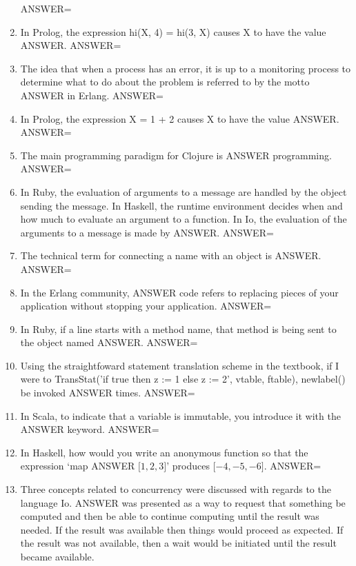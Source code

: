 \documentclass{exam}
\begin{document}
\begin{enumerate}
ANSWER=
\item In Prolog, the expression hi(X, 4) = hi(3, X) causes X to have the value ANSWER.\newline
ANSWER=
\item The idea that when a process has an error, it is up to a monitoring process to determine what to do about the problem is referred to by the motto ANSWER in Erlang.\newline
ANSWER=
\item In Prolog, the expression X = 1 + 2 causes X to have the value ANSWER.\newline
ANSWER=
\item The main programming paradigm for Clojure is ANSWER programming.\newline
ANSWER=
\item In Ruby, the evaluation of arguments to a message are handled by the object sending the message.  In Haskell, the runtime environment decides when and how much to evaluate an argument to a function.  In Io, the evaluation of the arguments to a message is made by ANSWER.\newline
ANSWER=
\item The technical term for connecting a name with an object is ANSWER.\newline
ANSWER=
\item In the Erlang community, ANSWER code refers to replacing pieces of your application without stopping your application.\newline
ANSWER=
\item In Ruby, if a line starts with a method name, that method is being sent to the object named ANSWER.\newline
ANSWER=
\item Using the straightfoward statement translation scheme in the textbook, if I were to TransStat('if true then z := 1 else z := 2', vtable, ftable), newlabel() be invoked ANSWER times.\newline
ANSWER=
\item In Scala, to indicate that a variable is immutable, you introduce it with the ANSWER keyword.\newline
ANSWER=
\item In Haskell, how would you write an anonymous function so that the expression `map ANSWER $\lbrack 1, 2, 3\rbrack$' produces $\lbrack -4, -5, -6\rbrack$.\newline
ANSWER=
\item Three concepts related to concurrency were discussed with regards to the language Io.  ANSWER was presented as a way to request that something be computed and then be able to continue computing until the result was needed.  If the result was available then things would proceed as expected.  If the result was not available, then a wait would be initiated until the result became available.\newline

\end{enumerate}
\end{document}
